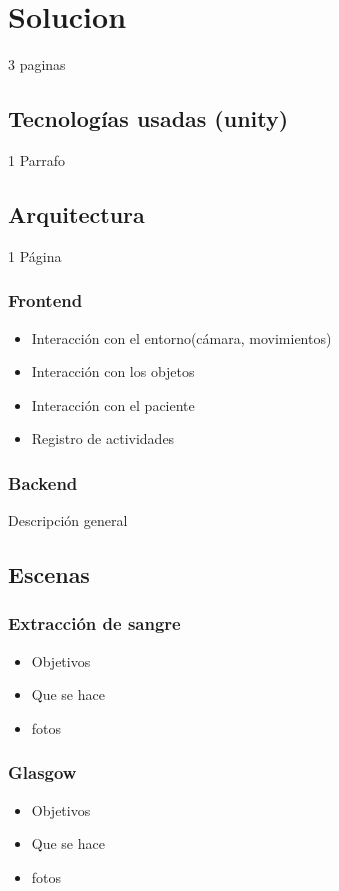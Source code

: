 \documentclass[conference]{IEEEtran}
\begin{document}
\section{Solucion}
3 paginas
\subsection{Tecnologías usadas (unity)}
1 Parrafo
\subsection{Arquitectura}
1 Página
\subsubsection{Frontend}
\begin{itemize}
\item Interacción con el entorno(cámara, movimientos)
\item Interacción con los objetos
\item Interacción con el paciente
\item Registro de actividades
\end{itemize}
\subsubsection{Backend}
Descripción general

\subsection{Escenas}
\subsubsection{Extracción de sangre}
\begin{itemize}
\item Objetivos
\item Que se hace
\item fotos
\end{itemize}
\subsubsection{Glasgow}
\begin{itemize}
\item Objetivos
\item Que se hace
\item fotos
\end{itemize}
\end{document}
